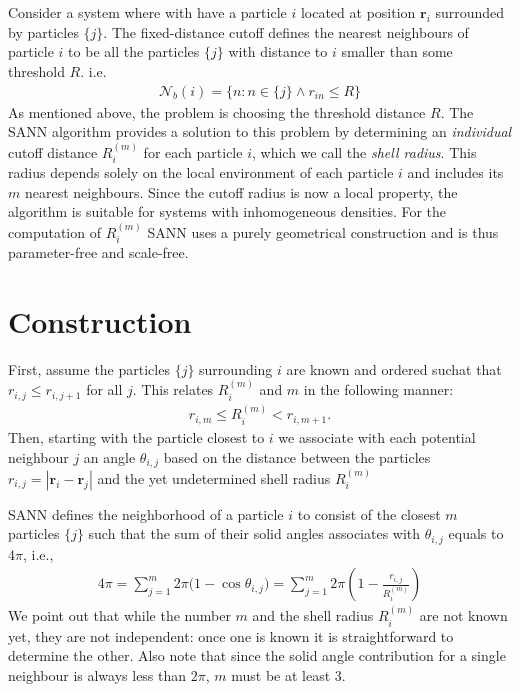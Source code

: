 \documentclass{report}
\begin{document}
\section{}

Consider a system where with have a particle $i$ located at position $\bm{r}_i$ surrounded by particles $\{j\}$. The fixed-distance cutoff defines the nearest neighbours of particle $i$ to be all the particles $\{j\}$ with distance to $i$ smaller than some threshold $R$. i.e.
\begin{align}
	\mathcal{N}_b(i)=\{n:n\in \{j\}\wedge r_{in}\leq R\}
\end{align}
As mentioned above, the problem is choosing the threshold distance $R$. The SANN algorithm provides a solution to this problem by determining an \textit{individual} cutoff distance $R_i^{(m)}$ for each particle $i$, which we call the \textit{shell radius}. This radius depends solely on the local environment of each particle $i$ and includes its $m$ nearest neighbours. Since the cutoff radius is now a local property, the algorithm is suitable for systems with inhomogeneous densities. For the computation of $R_i^{(m)}$ SANN uses a purely geometrical construction and is thus parameter-free and scale-free.

\section{Construction}

First, assume the particles $\{j\}$ surrounding $i$ are known and ordered suchat that $r_{i,j}\leq r_{i,j+1}$ for all $j$. This relates $R_i^{(m)}$ and $m$ in the following manner:
\begin{align}
	r_{i,m}\leq R_i^{(m)}<r_{i,m+1}.
\end{align}
Then, starting with the particle closest to $i$ we associate with each potential neighbour $j$ an angle $\theta_{i,j}$ based on the distance between the particles $r_{i,j}=|\bm{r}_i-\bm{r}_j|$ and the yet undetermined shell radius $R_i^{(m)}$


SANN defines the neighborhood of a particle $i$ to consist of the closest $m$ particles $\{j\}$ such that the sum of their solid angles associates with $\theta_{i,j}$ equals to $4\pi$, i.e.,
\begin{align}
	4\pi=\sum_{j=1}^m2\pi\big(1-\cos\theta_{i,j}\big)=\sum_{j=1}^m2\pi\left(1-\frac{r_{i,j}}{R_i^{(m)}}\right)
\end{align}
We point out that while the number $m$ and the shell radius $R_i^{(m)}$ are not known yet, they are not independent: once one is known it is straightforward to determine the other. Also note that since the solid angle contribution for a single neighbour is always less than $2\pi$, $m$ must be at least 3. 
\end{document}
